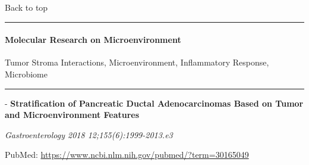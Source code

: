 \documentclass[]{article}
\let\oldparagraph\paragraph
\renewcommand{\paragraph}[1]{\oldparagraph{#1}\mbox{}}
\begin{document}
Back to top

\begin{center}\rule{0.5\linewidth}{\linethickness}\end{center}

\pagebreak

\hypertarget{molecular-research-on-microenvironment}{%
\paragraph{Molecular Research on
Microenvironment}\label{molecular-research-on-microenvironment}}

Tumor Stroma Interactions, Microenvironment, Inflammatory Response,
Microbiome

\begin{center}\rule{0.5\linewidth}{\linethickness}\end{center}

 - \textbf{Stratification of Pancreatic Ductal Adenocarcinomas Based on
Tumor and Microenvironment Features}

\emph{Gastroenterology 2018 12;155(6):1999-2013.e3}

PubMed: \url{https://www.ncbi.nlm.nih.gov/pubmed/?term=30165049}
\end{document}

